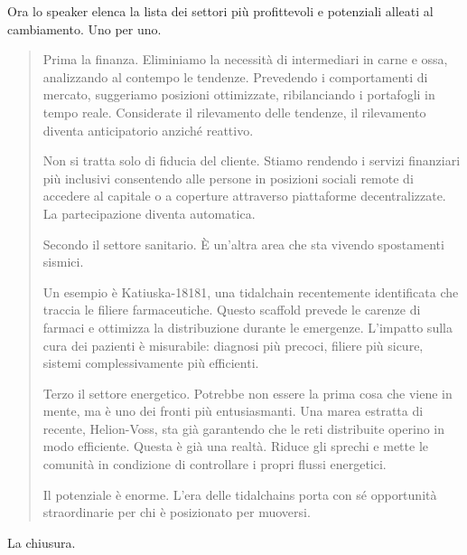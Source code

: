 
Ora lo speaker elenca la lista dei settori più profittevoli e potenziali alleati al cambiamento. Uno per uno.

\begin{quote}
Prima la finanza. Eliminiamo la necessità di intermediari in carne e ossa, analizzando al contempo le tendenze. Prevedendo i comportamenti di mercato, suggeriamo posizioni ottimizzate, ribilanciando i portafogli in tempo reale. Considerate il rilevamento delle tendenze, il rilevamento diventa anticipatorio anziché reattivo.

Non si tratta solo di fiducia del cliente. Stiamo rendendo i servizi finanziari più inclusivi consentendo alle persone in posizioni sociali remote di accedere al capitale o a coperture attraverso piattaforme decentralizzate. La partecipazione diventa automatica.

Secondo il settore sanitario. È un'altra area che sta vivendo spostamenti sismici.

Un esempio è Katiuska-18181, una tidalchain recentemente identificata che traccia le filiere farmaceutiche. Questo scaffold prevede le carenze di farmaci e ottimizza la distribuzione durante le emergenze. L'impatto sulla cura dei pazienti è misurabile: diagnosi più precoci, filiere più sicure, sistemi complessivamente più efficienti.

Terzo il settore energetico. Potrebbe non essere la prima cosa che viene in mente, ma è uno dei fronti più entusiasmanti. Una marea estratta di recente, Helion-Voss, sta già garantendo che le reti distribuite operino in modo efficiente. Questa è già una realtà. Riduce gli sprechi e mette le comunità in condizione di controllare i propri flussi energetici. 

Il potenziale è enorme. L'era delle tidalchains porta con sé opportunità straordinarie per chi è posizionato per muoversi.

\end{quote}


La chiusura.

